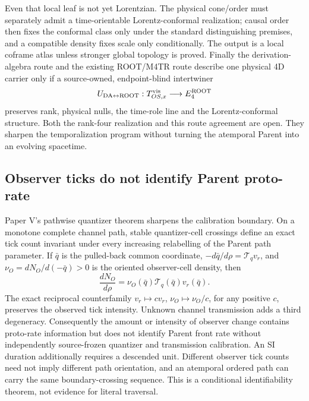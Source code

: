 \documentclass[11pt]{article}
\begin{document}
Even that local leaf is not yet Lorentzian.  The physical cone/order must
separately admit a time-orientable Lorentz-conformal realization; causal
order then fixes the conformal class only under the standard distinguishing
premises, and a compatible density fixes scale only conditionally.  The
output is a local coframe atlas unless stronger global topology is proved.
Finally the derivation-algebra route and the existing ROOT/M4TR route describe
one physical 4D carrier only if a source-owned, endpoint-blind intertwiner
\begin{equation}
 U_{\rm DA\leftrightarrow ROOT}:
 T^{\rm vis}_{OS,x}\longrightarrow E^{\rm ROOT}_4
 \label{eq:synthesis-da-root-intertwiner}
\end{equation}
preserves rank, physical nulls, the time-role line and the Lorentz-conformal
structure.  Both the rank-four realization and this route agreement are open.
They sharpen the temporalization program without turning the atemporal Parent
into an evolving spacetime.

\subsection{Observer ticks do not identify Parent proto-rate}

Paper V's pathwise quantizer theorem sharpens the calibration boundary.  On a
monotone complete channel path, stable quantizer-cell crossings define an
exact tick count invariant under every increasing relabelling of the Parent
path parameter.  If \(\bar q\) is the pulled-back common coordinate,
\(-d\bar q/d\rho=\mathcal T_qv_r\), and
\(\nu_O=dN_O/d(-\bar q)>0\) is the oriented observer-cell density, then
\begin{equation}
 \boxed{\frac{dN_O}{d\rho}=\nu_O(\bar q)\mathcal T_q(\bar q)v_r(\bar q).}
 \label{eq:observer-tick-factorization}
\end{equation}
The exact reciprocal counterfamily
\(v_r\mapsto c v_r\), \(\nu_O\mapsto\nu_O/c\), for any positive \(c\),
preserves the observed tick intensity.  Unknown channel transmission adds a
third degeneracy.  Consequently the amount or intensity of observer change
contains proto-rate information but does not identify Parent front rate
without independently source-frozen quantizer and transmission calibration.
An SI duration additionally requires a descended unit.  Different observer
tick counts need not imply different path orientation, and an atemporal
ordered path can carry the same boundary-crossing sequence.  This is a
conditional identifiability theorem, not evidence for literal traversal.
\end{document}
